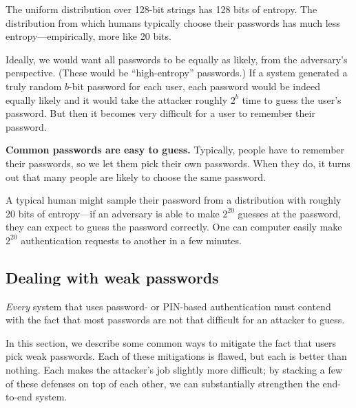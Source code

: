 \documentclass[
  letterpaper,
]{scrbook}
\theoremstyle{definition}
\theoremstyle{plain}
\theoremstyle{plain}
\theoremstyle{remark}
\begin{document}

The uniform distribution over 128-bit strings has 128 bits of entropy.
The distribution from which humans typically choose their passwords has
much less entropy---empirically, more like 20 bits.

Ideally, we would want all passwords to be equally as likely, from the
adversary's perspective. (These would be ``high-entropy'' passwords.) If
a system generated a truly random \(b\)-bit password for each user, each
password would be indeed equally likely and it would take the attacker
roughly \(2^b\) time to guess the user's password. But then it becomes
very difficult for a user to remember their password.

\textbf{Common passwords are easy to guess.} Typically, people have to
remember their passwords, so we let them pick their own passwords. When
they do, it turns out that many people are likely to choose the same
password.

A typical human might sample their password from a distribution with
roughly 20 bits of entropy---if an adversary is able to make \(2^{20}\)
guesses at the password, they can expect to guess the password
correctly. One can computer easily make \(2^{20}\) authentication
requests to another in a few minutes.

\subsection{Dealing with weak
passwords}\label{dealing-with-weak-passwords}

\emph{Every} system that uses password- or PIN-based authentication must
contend with the fact that most passwords are not that difficult for an
attacker to guess.

In this section, we describe some common ways to mitigate the fact that
users pick weak passwords. Each of these mitigations is flawed, but each
is better than nothing. Each makes the attacker's job slightly more
difficult; by stacking a few of these defenses on top of each other, we
can substantially strengthen the end-to-end system.
\end{document}
